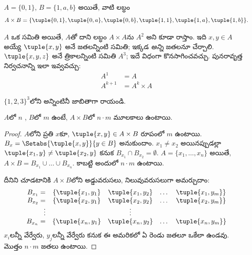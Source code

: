 \documentclass[../../../include/open-logic-section]{subfiles}
\begin{document}
\begin{ex}
$A = \{0, 1\}$, $B = \{1, a, b\}$ అయితే, వాటి లబ్ధం
\[
A \times B = \{ \tuple{0, 1}, \tuple{0, a}, \tuple{0, b},
    \tuple{1, 1}, \tuple{1, a}, \tuple{1, b} \}.
\]
\end{ex}

\begin{ex}
$A$ ఒక సమితి అయితే, $A$తో దాని లబ్ధం $A \times A$ను $A^2$
అని కూడా రాస్తాం. ఇది $x, y \in A$ అయ్యే $\tuple{x, y}$ అనే
జతలన్నింటి సమితి; ఇక్కడ \emph{అన్ని} జతలనూ చేర్చాలి.
$\tuple{x, y, z}$ అనే త్రికాలన్నింటి సమితి $A^3$; ఇదే విధంగా
కొనసాగించవచ్చు. పునరావృత్త నిర్వచనాన్ని ఇలా ఇవ్వవచ్చు:
\begin{align*}
  A^1 & = A\\
  A^{k+1} & = A^k \times A
\end{align*}
\end{ex}

\begin{prob}
$\{1, 2, 3\}^3$లోని  అన్నింటినీ జాబితాగా రాయండి.
\end{prob}

\begin{prop}
$A$లో $n$ , $B$లో $m$  ఉంటే,
$A \times B$లో $n\cdot m$ మూలకాలు ఉంటాయి.
\end{prop}

\begin{proof}
$A$లోని ప్రతి  $x$కూ, $\tuple{x, y} \in A \times B$
రూపంలో $m$  ఉంటాయి. $B_x = \Setabs{\tuple{x, y}}{y
  \in B}$ అనుకుందాం. $x_1 \neq x_2$ అయినప్పుడల్లా
$\tuple{x_1, y} \neq \tuple{x_2, y}$ కనుక
$B_{x_1} \cap B_{x_2} = \emptyset$.
$A = \{x_1, \dots, x_n\}$ అయితే,
$A \times B = B_{x_1} \cup \dots \cup B_{x_n}$.
కాబట్టి అందులో $n\cdot m$  ఉంటాయి.

దీనిని చూడటానికి $A \times B$లోని 
అడ్డువరుసలు, నిలువువరుసలుగా అమర్చుదాం:
\[
\begin{array}{rcccc}
  B_{x_1} = & \{\tuple{x_1, y_1} & \tuple{x_1, y_2} & \dots & \tuple{x_1, y_m}\}\\
  B_{x_2} = & \{\tuple{x_2, y_1} & \tuple{x_2, y_2} & \dots & \tuple{x_2, y_m}\}\\
  \vdots & & \vdots\\
  B_{x_n} = & \{\tuple{x_n, y_1} & \tuple{x_n, y_2} & \dots & \tuple{x_n, y_m}\}
\end{array}
\]
$x_i$లన్నీ వేర్వేరు, $y_j$లన్నీ వేర్వేరు కనుక ఈ అమరికలో
ఏ రెండు జతలూ ఒకేలా ఉండవు. మొత్తం $n\cdot m$ జతలు ఉంటాయి.
\end{proof}
\end{document}
